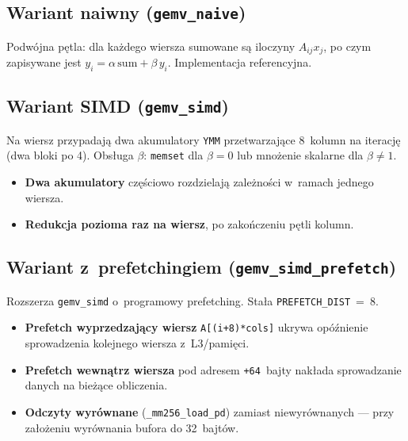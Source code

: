 \documentclass[a4paper,12pt]{book} %
\newcommand{\kod}[1]{\texttt{#1}}
\begin{document}
\subsection{Wariant naiwny (\kod{gemv\_naive})}
Podwójna pętla: dla każdego wiersza sumowane są iloczyny $A_{ij}x_j$, po czym
zapisywane jest $y_i = \alpha\,\mathrm{sum} + \beta\,y_i$. Implementacja
referencyjna.

\subsection{Wariant SIMD (\kod{gemv\_simd})}
Na wiersz przypadają dwa akumulatory \kod{YMM} przetwarzające 8~kolumn na
iterację (dwa bloki po 4). Obsługa $\beta$: \kod{memset} dla $\beta=0$ lub
mnożenie skalarne dla $\beta\neq1$.
\begin{itemize}
\item \textbf{Dwa akumulatory} częściowo rozdzielają zależności w~ramach jednego
  wiersza.
\item \textbf{Redukcja pozioma raz na wiersz}, po zakończeniu pętli kolumn.
\end{itemize}

\subsection{Wariant z~prefetchingiem (\kod{gemv\_simd\_prefetch})}
Rozszerza \kod{gemv\_simd} o~programowy prefetching. Stała
\kod{PREFETCH\_DIST}~=~8.
\begin{itemize}
\item \textbf{Prefetch wyprzedzający wiersz} \kod{A[(i+8)*cols]} ukrywa
  opóźnienie sprowadzenia kolejnego wiersza z~L3/pamięci.
\item \textbf{Prefetch wewnątrz wiersza} pod adresem \kod{+64}~bajty nakłada
  sprowadzanie danych na bieżące obliczenia.
\item \textbf{Odczyty wyrównane} (\kod{\_mm256\_load\_pd}) zamiast
  niewyrównanych --- przy założeniu wyrównania bufora do 32~bajtów.
\end{itemize}
\end{document}
